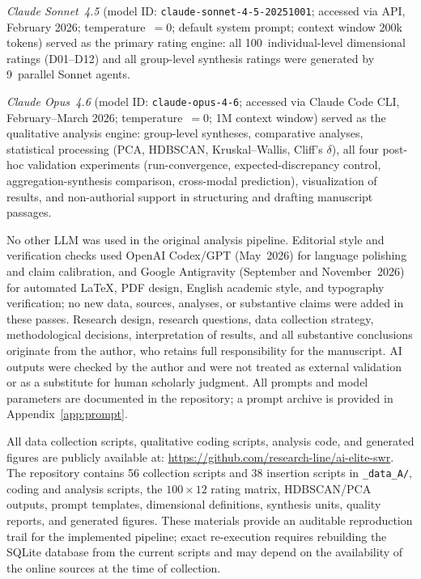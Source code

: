 \documentclass[12pt,a4paper]{article}
\begin{document}
\emph{Claude Sonnet~4.5} (model ID: \texttt{claude-sonnet-4-5-20251001}; accessed via API, February 2026; temperature~$= 0$; default system prompt; context window 200k tokens) served as the primary rating engine: all 100~individual-level dimensional ratings (D01--D12) and all group-level synthesis ratings were generated by 9~parallel Sonnet agents.

\emph{Claude Opus~4.6} (model ID: \texttt{claude-opus-4-6}; accessed via Claude Code CLI, February--March 2026; temperature~$= 0$; 1M context window) served as the qualitative analysis engine: group-level syntheses, comparative analyses, statistical processing (PCA, HDBSCAN, Kruskal--Wallis, Cliff's $\delta$), all four post-hoc validation experiments (run-convergence, expected-discrepancy control, aggregation-synthesis comparison, cross-modal prediction), visualization of results, and non-authorial support in structuring and drafting manuscript passages.

No other LLM was used in the original analysis pipeline. Editorial style and verification checks used OpenAI Codex/GPT (May~2026) for language polishing and claim calibration, and Google Antigravity (September and November~2026) for automated LaTeX, PDF design, English academic style, and typography verification; no new data, sources, analyses, or substantive claims were added in these passes. Research design, research questions, data collection strategy, methodological decisions, interpretation of results, and all substantive conclusions originate from the author, who retains full responsibility for the manuscript. AI outputs were checked by the author and were not treated as external validation or as a substitute for human scholarly judgment. All prompts and model parameters are documented in the repository; a prompt archive is provided in Appendix~\ref{app:prompt}.




\smallskip
{}

\noindent All data collection scripts, qualitative coding scripts, analysis code, and generated figures are publicly available at: \url{https://github.com/research-line/ai-elite-swr}. The repository contains 56 collection scripts and 38 insertion scripts in \texttt{\_data\_A/}, coding and analysis scripts, the $100\times12$ rating matrix, HDBSCAN/PCA outputs, prompt templates, dimensional definitions, synthesis units, quality reports, and generated figures. These materials provide an auditable reproduction trail for the implemented pipeline; exact re-execution requires rebuilding the SQLite database from the current scripts and may depend on the availability of the online sources at the time of collection.
\endgroup
\end{document}
